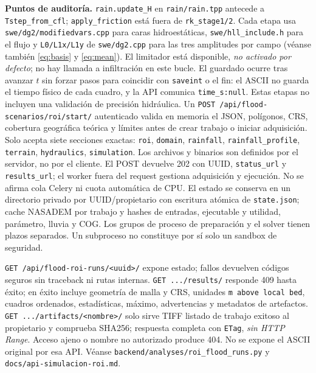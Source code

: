 \documentclass[11pt,a4paper]{article}
\newcommand{\src}[1]{\nolinkurl{#1}}
\begin{document}
\noindent\textbf{Puntos de auditoría.} \texttt{rain.update\_H} en \src{rain/rain.tpp} antecede a \texttt{Tstep\_from\_cfl}; \texttt{apply\_friction} está fuera de \texttt{rk\_stage1/2}. Cada etapa usa \src{swe/dg2/modifiedvars.cpp} para caras hidroestáticas, \src{swe/hll_include.h} para el flujo y \texttt{L0/L1x/L1y} de \src{swe/dg2.cpp} para las tres amplitudes por campo (véanse también \eqref{eq:basis} y \eqref{eq:mean}). El limitador está disponible, \emph{no activado por defecto}; no hay llamada a infiltración en este bucle. El guardado ocurre tras avanzar $t$ sin forzar pasos para coincidir con \texttt{saveint} o el fin: el ASCII no guarda el tiempo físico de cada cuadro, y la API comunica \texttt{time\_s:null}. Estas etapas no incluyen una validación de precisión hidráulica.
\newpage
\noindent Un \texttt{POST /api/flood-scenarios/roi/start/} autenticado valida en memoria el JSON, polígonos, CRS, cobertura geográfica teórica y límites antes de crear trabajo o iniciar adquisición. Solo acepta siete secciones exactas: \texttt{roi}, \texttt{domain}, \texttt{rainfall}, \texttt{rainfall\_profile}, \texttt{terrain}, \texttt{hydraulics}, \texttt{simulation}. Los archivos y binarios son definidos por el servidor, no por el cliente. El POST devuelve 202 con UUID, \texttt{status\_url} y \texttt{results\_url}; el worker fuera del request gestiona adquisición y ejecución. No se afirma cola Celery ni cuota automática de CPU. El estado se conserva en un directorio privado por UUID/propietario con escritura atómica de \texttt{state.json}; cache NASADEM por trabajo y hashes de entradas, ejecutable y utilidad, parámetro, lluvia y COG. Los grupos de proceso de preparación y el solver tienen plazos separados. Un subproceso no constituye por sí solo un sandbox de seguridad.

\begin{center}
\end{center}
\noindent\texttt{GET /api/flood-roi-runs/<uuid>/} expone estado; fallos devuelven códigos seguros sin traceback ni rutas internas. \texttt{GET .../results/} responde 409 hasta éxito; en éxito incluye geometría de malla y CRS, unidades \texttt{m above local bed}, cuadros ordenados, estadísticas, máximo, advertencias y metadatos de artefactos. \texttt{GET .../artifacts/<nombre>/} solo sirve TIFF listado de trabajo exitoso al propietario y comprueba SHA256; respuesta completa con \texttt{ETag}, \emph{sin HTTP Range}. Acceso ajeno o nombre no autorizado produce 404. No se expone el ASCII original por esa API. Véanse \src{backend/analyses/roi_flood_runs.py} y \src{docs/api-simulacion-roi.md}.
\end{document}
